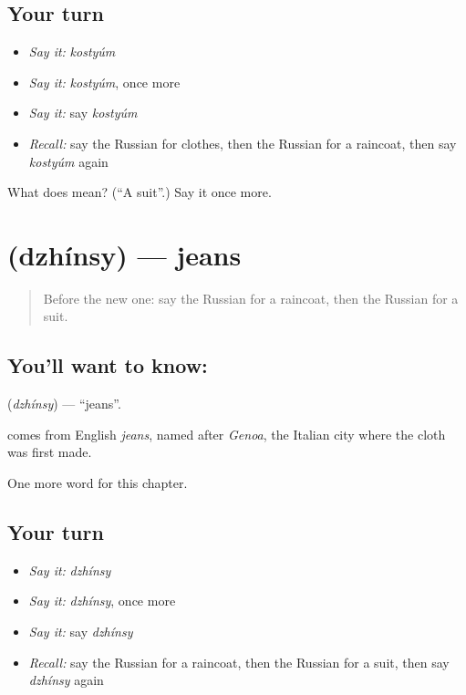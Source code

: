 \subsection*{Your turn}
\begin{itemize}
\raggedright
  \item \emph{Say it:} \emph{kostyúm}
  \item \emph{Say it:} \emph{kostyúm}, once more
  \item \emph{Say it:} say \emph{kostyúm}
  \item \emph{Recall:} say the Russian for clothes, then the Russian for a raincoat, then say \emph{kostyúm} again
\end{itemize}

\begin{tcolorbox}[breakable,colback=teal!4,colframe=teal!35!black,title={Before you move on}]
What does  mean? (\textquotedblleft{}A suit\textquotedblright{}.) Say it once more.
\end{tcolorbox}
\section[\texorpdfstring{\ru{джинсы} (dzhínsy)}{джинсы (dzhínsy)}]{ (dzhínsy) — jeans}

\label{lesson:RU-C248-dzhinsy}



\begin{quote}
Before the new one: say the Russian for a raincoat, then the Russian for a suit.
\end{quote}

\subsection*{You'll want to know: }
\textbf{} (\emph{dzhínsy}) — \textquotedblleft{}jeans\textquotedblright{}.

\begin{cousinweb}
\textbf{} comes from English \emph{jeans}, named after \emph{Genoa}, the Italian city where the cloth was first made.
\end{cousinweb}

\begin{grammarlens}[title={What you've built}]
One more word for this chapter.
\end{grammarlens}

\subsection*{Your turn}
\begin{itemize}
\raggedright
  \item \emph{Say it:} \emph{dzhínsy}
  \item \emph{Say it:} \emph{dzhínsy}, once more
  \item \emph{Say it:} say \emph{dzhínsy}
  \item \emph{Recall:} say the Russian for a raincoat, then the Russian for a suit, then say \emph{dzhínsy} again
\end{itemize}

